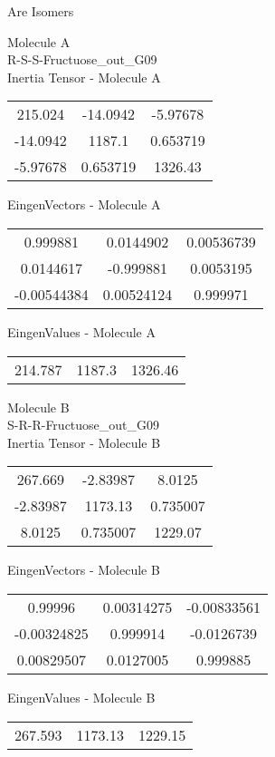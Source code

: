 \begin{center}
\vtab
\vtab
\textcolor{NavyBlue}{\Large Are Isomers}
\end{center}
\newpage
\begin{multicols}{2}
\begin{center}
Molecule A \\ 
R-S-S-Fructuose\_out\_G09
\\
Inertia Tensor - Molecule A \\
\vtab
\begin{tabular}{|c c c|}
215.024	 & 	-14.0942	 & 	-5.97678	 \\
-14.0942	 & 	1187.1	 & 	0.653719	 \\
-5.97678	 & 	0.653719	 & 	1326.43
\end{tabular}

\vtab
 EingenVectors - Molecule A     \\
\vtab
\begin{tabular}{|c c c|}
0.999881	 & 	0.0144902	 & 	0.00536739	 \\
0.0144617	 & 	-0.999881	 & 	0.0053195	 \\
-0.00544384	 & 	0.00524124	 & 	0.999971
\end{tabular}

\vtab
 EingenValues - Molecule A     \\
\vtab
\begin{tabular}{|c c c|}
214.787	 & 	1187.3	 & 	1326.46
\end{tabular}
\columnbreak

Molecule B \\ 
S-R-R-Fructuose\_out\_G09
\\
Inertia Tensor - Molecule B \\
\vtab
\begin{tabular}{|c c c|}
267.669	 & 	-2.83987	 & 	8.0125	 \\
-2.83987	 & 	1173.13	 & 	0.735007	 \\
8.0125	 & 	0.735007	 & 	1229.07
\end{tabular}

\vtab
 EingenVectors - Molecule B     \\
\vtab
\begin{tabular}{|c c c|}
0.99996	 & 	0.00314275	 & 	-0.00833561	 \\
-0.00324825	 & 	0.999914	 & 	-0.0126739	 \\
0.00829507	 & 	0.0127005	 & 	0.999885
\end{tabular}

\vtab
 EingenValues - Molecule B     \\
\vtab
\begin{tabular}{|c c c|}
267.593	 & 	1173.13	 & 	1229.15
\end{tabular}

\end{center}
\end{multicols}
